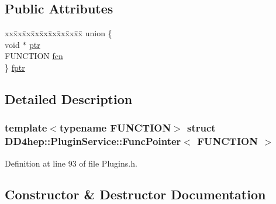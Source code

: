 \subsection*{Public Attributes}
\begin{DoxyCompactItemize}
\item 
\begin{tabbing}
xx\=xx\=xx\=xx\=xx\=xx\=xx\=xx\=xx\=\kill
union \{\\
\>void $\ast$ \hyperlink{struct_d_d4hep_1_1_plugin_service_1_1_func_pointer_a2de222ee867b2669e86af39351a05a68}{ptr}\\
\>FUNCTION \hyperlink{struct_d_d4hep_1_1_plugin_service_1_1_func_pointer_a1858e4504eb3117ff82f6c7c418ff386}{fcn}\\
\} \hyperlink{struct_d_d4hep_1_1_plugin_service_1_1_func_pointer_a148afe78c175741c86b0e99e1988562f}{fptr}\\

\end{tabbing}\end{DoxyCompactItemize}


\subsection{Detailed Description}
\subsubsection*{template$<$typename F\+U\+N\+C\+T\+I\+ON$>$\newline
struct D\+D4hep\+::\+Plugin\+Service\+::\+Func\+Pointer$<$ F\+U\+N\+C\+T\+I\+O\+N $>$}



Definition at line 93 of file Plugins.\+h.



\subsection{Constructor \& Destructor Documentation}
\hypertarget{struct_d_d4hep_1_1_plugin_service_1_1_func_pointer_ae5956ad0aad6406a1e9f8132ec730814}{}\label{struct_d_d4hep_1_1_plugin_service_1_1_func_pointer_ae5956ad0aad6406a1e9f8132ec730814} 
